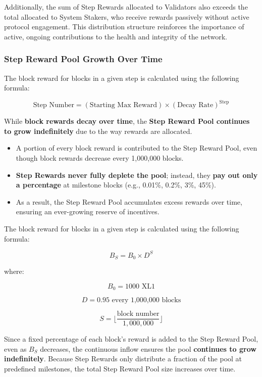 \documentclass{article}
\begin{document}
Additionally, the sum of Step Rewards allocated to Validators also exceeds the total allocated to System Stakers, who receive rewards passively without active protocol engagement. This distribution structure reinforces the importance of active, ongoing contributions to the health and integrity of the network.

\subsubsection{Step Reward Pool Growth Over Time}
The block reward for blocks in a given step is calculated using the following
formula:

\[
    \text{Step Number} = (\text{Starting Max Reward}) \times (\text{Decay Rate})^{\text{Step}}
\]

While \textbf{block rewards decay over time}, the \textbf{Step Reward Pool
    continues to grow indefinitely} due to the way rewards are allocated.

\begin{itemize}
    \item A portion of every block reward is contributed to the Step Reward Pool, even
          though block rewards decrease every 1,000,000 blocks.
    \item \textbf{Step Rewards never fully deplete the pool}; instead, they \textbf{pay out only a percentage} at milestone blocks (e.g., 0.01\%, 0.2\%, 3\%, 45\%).
    \item As a result, the Step Reward Pool accumulates excess rewards over time,
          ensuring an ever-growing reserve of incentives.
\end{itemize}

The block reward for blocks in a given step is calculated using the following
formula:

\[
    B_S = B_0 \times D^S
\]

where:

\[
    B_0 = 1000 \text{ XL1}
\]

\[
    D = 0.95 \text{ every 1,000,000 blocks}
\]

\[
    S = \lfloor \frac{\text{block number}}{1,000,000} \rfloor
\]

Since a fixed percentage of each block's reward is added to the Step Reward
Pool, even as \( B_S \) decreases, the continuous inflow ensures the pool
\textbf{continues to grow indefinitely}. Because Step Rewards only distribute a
fraction of the pool at predefined milestones, the total Step Reward Pool size
increases over time.
\end{document}
